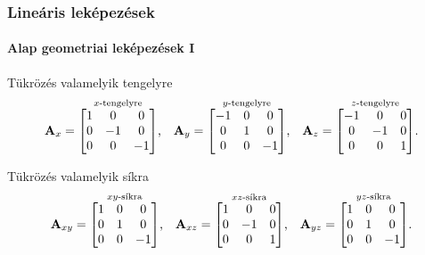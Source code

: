 \documentclass[xcolor={table}]{beamer}
\begin{document}
\begin{frame}
  \frametitle{Lineáris leképezések}
  \framesubtitle{Alap geometriai leképezések I}

  \begin{block}{Tükrözés valamelyik tengelyre}
    \[
      \mathbf{A}_x = \overset{x\text{-tengelyre}}{\begin{bmatrix}
          1 & 0  & 0  \\
          0 & -1 & 0  \\
          0 & 0  & -1
        \end{bmatrix}}
      \text,
      \quad
      \mathbf{A}_y = \overset{y\text{-tengelyre}}{\begin{bmatrix}
          -1 & 0 & 0  \\
          0  & 1 & 0  \\
          0  & 0 & -1
        \end{bmatrix}}
      \text,
      \quad
      \mathbf{A}_z = \overset{z\text{-tengelyre}}{\begin{bmatrix}
          -1 & 0  & 0 \\
          0  & -1 & 0 \\
          0  & 0  & 1
        \end{bmatrix}}
      \text.
    \]
  \end{block}

  \begin{block}{Tükrözés valamelyik síkra}
    \[
      \mathbf{A}_{xy} = \overset{xy\text{-síkra}}{\begin{bmatrix}
          1 & 0 & 0  \\
          0 & 1 & 0  \\
          0 & 0 & -1
        \end{bmatrix}}
      \text,
      \quad
      \mathbf{A}_{xz} = \overset{xz\text{-síkra}}{\begin{bmatrix}
          1 & 0  & 0 \\
          0 & -1 & 0 \\
          0 & 0  & 1
        \end{bmatrix}}
      \text,
      \quad
      \mathbf{A}_{yz} = \overset{yz\text{-síkra}}{\begin{bmatrix}
          1 & 0 & 0  \\
          0 & 1 & 0  \\
          0 & 0 & -1
        \end{bmatrix}}
      \text.
    \]
  \end{block}
\end{frame}
\end{document}
